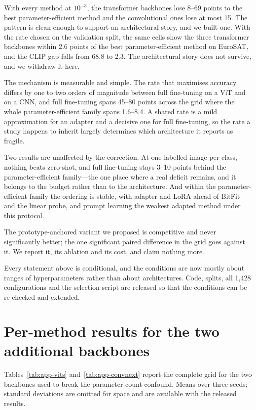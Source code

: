 \documentclass[preprint,12pt]{elsarticle}
\begin{document}
With every method at $10^{-3}$, the transformer backbones lose 8--69 points to the
best parameter-efficient method and the convolutional ones lose at most 15. The
pattern is clean enough to support an architectural story, and we built one. With
the rate chosen on the validation split, the same cells show the three transformer
backbones within 2.6 points of the best parameter-efficient method on EuroSAT, and
the CLIP gap falls from 68.8 to 2.3. The architectural story does not survive, and
we withdraw it here.

The mechanism is measurable and simple. The rate that maximises accuracy differs
by one to two orders of magnitude between full fine-tuning on a ViT and on a CNN,
and full fine-tuning spans 45--80 points across the grid where the whole
parameter-efficient family spans 1.6--8.4. A shared rate is a mild approximation
for an adapter and a decisive one for full fine-tuning, so the rate a study
happens to inherit largely determines which architecture it reports as fragile.

Two results are unaffected by the correction. At one labelled image per class,
nothing beats zero-shot, and full fine-tuning stays 3--10 points behind the
parameter-efficient family---the one place where a real deficit remains, and it
belongs to the budget rather than to the architecture. And within the
parameter-efficient family the ordering is stable, with adapter and LoRA ahead of
BitFit and the linear probe, and prompt learning the weakest adapted method under
this protocol.

The prototype-anchored variant we proposed is competitive and never significantly
better; the one significant paired difference in the grid goes against it. We
report it, its ablation and its cost, and claim nothing more.

Every statement above is conditional, and the conditions are now mostly about
ranges of hyperparameters rather than about architectures. Code, splits, all
1{,}428 configurations and the selection script are released so that the
conditions can be re-checked and extended.

\appendix
\section{Per-method results for the two additional backbones}
\label{app:extra}

Tables~\ref{tab:app-vits} and~\ref{tab:app-convnext} report the complete grid for
the two backbones used to break the parameter-count confound. Means over three
seeds; standard deviations are omitted for space and are available with the
released results.
\end{document}
